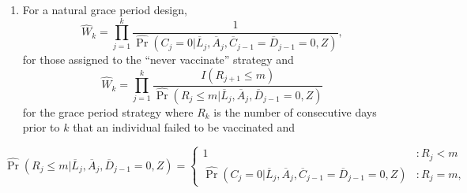 \begin{appendices}
\begin{refsection}
\begin{enumerate}
\begin{enumerate}
\begin{enumerate}
                \item For a natural grace period design,
                $$\widehat{W}_k = \prod_{j = 1}^k \frac{1}{\widehat{\Pr}(C_j  = 0|\overline{L}_j, \overline{A}_j, \overline{C}_{j-1} = \overline{D}_{j-1} = 0, Z)},$$
                for those assigned to the ``never vaccinate'' strategy and
                $$\widehat{W}_k = \prod_{j = 1}^k \frac{I(R_{j+1} \leq m)}{\widehat{\Pr}(R_j \leq m | \overline{L}_j, \overline{A}_j, \overline{D}_{j-1} = 0, Z)}$$
                for the grace period strategy where $R_k$ is the number of consecutive days prior to $k$ that an individual failed to be vaccinated and
            \end{enumerate}
            $$\widehat{\Pr}(R_j \leq m | \overline{L}_j, \overline{A}_j, \overline{D}_{j-1} = 0, Z) = \begin{cases}
                1 & : R_j < m\\
                \widehat{\Pr}(C_j  = 0|\overline{L}_j, \overline{A}_j, \overline{C}_{j-1} = \overline{D}_{j-1} = 0, Z) & : R_j = m,
            \end{cases}$$
        \end{enumerate}


\end{enumerate}
\end{refsection}
\end{appendices}
